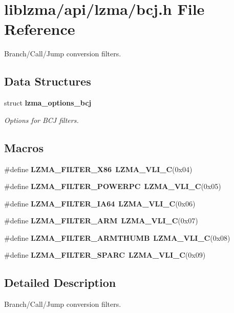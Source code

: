 \section{liblzma/api/lzma/bcj.h File Reference}
\label{bcj_8h}


Branch/\-Call/\-Jump conversion filters.  


\subsection*{Data Structures}
\begin{DoxyCompactItemize}
\item 
struct {\bf lzma\-\_\-options\-\_\-bcj}
\begin{DoxyCompactList}\small\item\em Options for B\-C\-J filters. \end{DoxyCompactList}\end{DoxyCompactItemize}
\subsection*{Macros}
\begin{DoxyCompactItemize}
\item 
\#define {\bf L\-Z\-M\-A\-\_\-\-F\-I\-L\-T\-E\-R\-\_\-\-X86}~{\bf L\-Z\-M\-A\-\_\-\-V\-L\-I\-\_\-\-C}(0x04)
\item 
\#define {\bf L\-Z\-M\-A\-\_\-\-F\-I\-L\-T\-E\-R\-\_\-\-P\-O\-W\-E\-R\-P\-C}~{\bf L\-Z\-M\-A\-\_\-\-V\-L\-I\-\_\-\-C}(0x05)
\item 
\#define {\bf L\-Z\-M\-A\-\_\-\-F\-I\-L\-T\-E\-R\-\_\-\-I\-A64}~{\bf L\-Z\-M\-A\-\_\-\-V\-L\-I\-\_\-\-C}(0x06)
\item 
\#define {\bf L\-Z\-M\-A\-\_\-\-F\-I\-L\-T\-E\-R\-\_\-\-A\-R\-M}~{\bf L\-Z\-M\-A\-\_\-\-V\-L\-I\-\_\-\-C}(0x07)
\item 
\#define {\bf L\-Z\-M\-A\-\_\-\-F\-I\-L\-T\-E\-R\-\_\-\-A\-R\-M\-T\-H\-U\-M\-B}~{\bf L\-Z\-M\-A\-\_\-\-V\-L\-I\-\_\-\-C}(0x08)
\item 
\#define {\bf L\-Z\-M\-A\-\_\-\-F\-I\-L\-T\-E\-R\-\_\-\-S\-P\-A\-R\-C}~{\bf L\-Z\-M\-A\-\_\-\-V\-L\-I\-\_\-\-C}(0x09)
\end{DoxyCompactItemize}


\subsection{Detailed Description}
Branch/\-Call/\-Jump conversion filters. 

